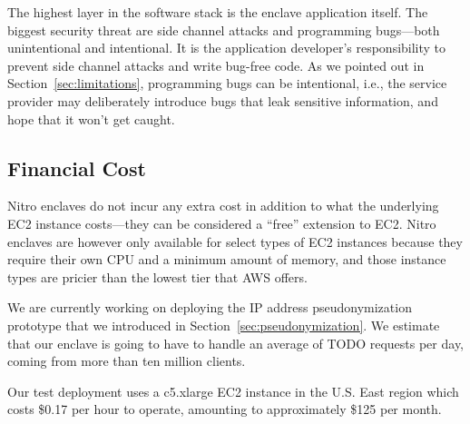 The highest layer in the software stack is the enclave application itself.  The
biggest security threat are side channel attacks and programming bugs---both
unintentional and intentional.  It is the application developer's responsibility
to prevent side channel attacks and write bug-free code.  As we pointed out in
Section~\ref{sec:limitations}, programming bugs can be intentional, i.e., the
service provider may deliberately introduce bugs that leak sensitive
information, and hope that it won't get caught.

\subsection{Financial Cost}
\label{sec:cost}

Nitro enclaves do not incur any extra cost in addition to what the underlying
EC2 instance costs---they can be considered a ``free'' extension to EC2.  Nitro
enclaves are however only available for select types of EC2 instances because
they require their own CPU and a minimum amount of memory, and those instance
types are pricier than the lowest tier that AWS offers.

We are currently working on deploying the IP address pseudonymization prototype
that we introduced in Section~\ref{sec:pseudonymization}.  We estimate that our
enclave is going to have to handle an average of TODO requests per day, coming
from more than ten million clients.


Our test deployment uses a c5.xlarge EC2 instance in the U.S. East region which
costs \$0.17 per hour to operate, amounting to approximately \$125 per month.



%
%
%
%
%
%
